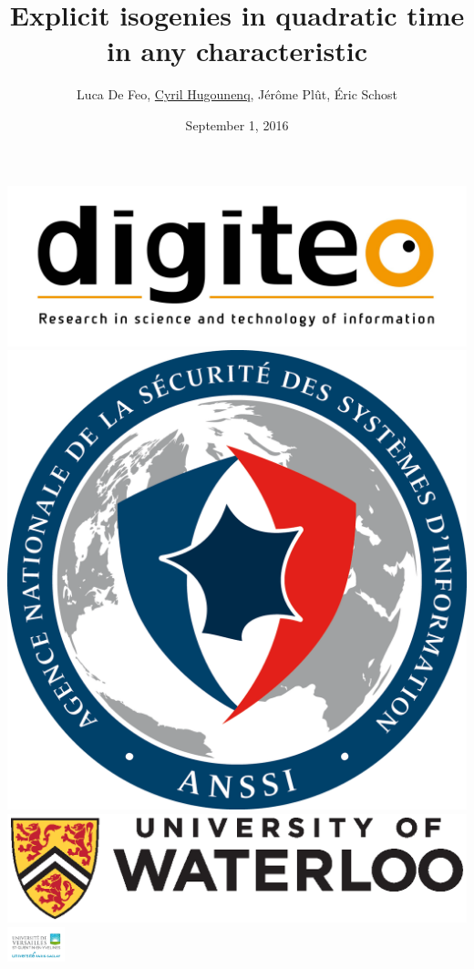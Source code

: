 \documentclass[10pt,a4paper]{beamer}
\theoremstyle{plain}
\theoremstyle{definition}
\theoremstyle{definition}
\theoremstyle{definition}
\theoremstyle{definition}
\theoremstyle{remark}
\theoremstyle{remark}
\begin{document}
\author{
 Luca De Feo, \underline{Cyril Hugounenq}, J\'er\^ome Pl\^ut, \'Eric Schost
}
\title[Explicit isogenies in quadratic time in any characteristic]{
Explicit isogenies in quadratic time in any characteristic}
\date{September 1, 2016}


\begin{frame}
\titlepage

\hfill
\includegraphics[scale=0.1]{Images/digiteo.jpg}\hfill
\includegraphics[scale=0.03]{Images/Anssi.png}\hfill
\includegraphics[scale=0.18]{Images/UniversityOfWaterloo_logo_horiz_pms.eps}\hfill
\includegraphics[height=10mm]{Images/uvsq-logo-cmjn.jpg}
\end{frame}
\end{document}
